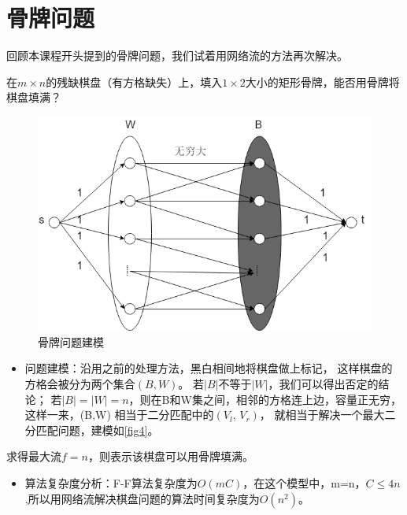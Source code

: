 \section{骨牌问题}
回顾本课程开头提到的骨牌问题，我们试着用网络流的方法再次解决。
\begin{example}
    在\(m \times n\)的残缺棋盘（有方格缺失）上，填入\(1 \times 2\)大小的矩形骨牌，能否用骨牌将棋盘填满？
\end{example}

\begin{figure}[htb]
  \centering
  \includegraphics[scale=0.6]{Ln11.image/networkflow4.png}
  \caption{骨牌问题建模}\label{fig4}
\end{figure}

\begin{itemize}
    \item 问题建模：沿用之前的处理方法，黑白相间地将棋盘做上标记，
        这样棋盘的方格会被分为两个集合\((B,W)\)。
        若\(|B|\)不等于\(|W|\)，我们可以得出否定的结论；
        若\(|B|=|W|=n\)，则在B和W集之间，相邻的方格连上边，容量正无穷，
        这样一来，(B,W) 相当于二分匹配中的\((V_l,\,V_r)\)，
        就相当于解决一个最大二分匹配问题，建模如\autoref{fig4}。
\end{itemize}

求得最大流\(f=n\)，则表示该棋盘可以用骨牌填满。
\begin{itemize}
 \item 算法复杂度分析：F-F算法复杂度为\(O(mC)\)，在这个模型中，m=n，\(C \le 4n\),所以用网络流解决棋盘问题的算法时间复杂度为\(O(n^2)\)。
\end{itemize}

